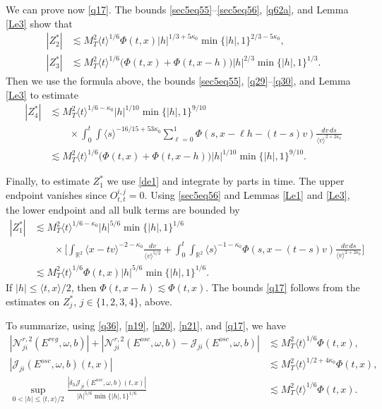 \documentclass[reqno,11pt]{amsart}
\numberwithin{equation}{section}
\def\R{{\mathbb R}}
\def\R{{\bf R}}
\def\R{\mathbb{R}}
\begin{document}
We can prove now \eqref{q17}. The bounds \eqref{sec5eq55}--\eqref{sec5eq56}, \eqref{q62a}, and Lemma \ref{Le3} show that
\begin{align*}
|Z_2^\ast|
&\lesssim M_T^2\langle t\rangle^{1/6}\Phi(t,x)
|h|^{1/3+5\kappa_0}\min\{|h|,1\}^{2/3-5\kappa_0},\\
|Z_3^\ast|
&\lesssim M_T^2\langle t\rangle^{1/6}
\big(\Phi(t,x)+\Phi(t,x-h)\big)
|h|^{2/3}\min\{|h|,1\}^{1/3}.
\end{align*}
Then we use the formula above, the bounds \eqref{sec5eq55}, \eqref{q29}--\eqref{q30}, and Lemma \ref{Le3} to estimate
\begin{align*}
|Z_4^\ast|&\lesssim M_T^2\langle t\rangle^{1/6-\kappa_0}
|h|^{1/10}\min\{|h|,1\}^{9/10}\\
&\qquad\times\int_0^t\!\!\int
\langle s\rangle^{-16/15+53\kappa_0}
\sum_{\ell=0}^1\Phi(s,x-\ell h-(t-s)v)
\frac{dv\,ds}{\langle v\rangle^{2+2\kappa_0}}\\
&\lesssim M_T^2\langle t\rangle^{1/6}
\big(\Phi(t,x)+\Phi(t,x-h)\big)
|h|^{1/10}\min\{|h|,1\}^{9/10}.
\end{align*}
 
Finally, to estimate $Z_1^\ast$ we use \eqref{de1} and integrate by parts in time. The upper
endpoint vanishes since $O_{t,t}^{i,j}=0$. Using \eqref{sec5eq56} and Lemmas \ref{Le1} and \ref{Le3}, the lower endpoint and all bulk
terms are bounded by
\begin{align*}
|Z_1^\ast|
&\lesssim M_T^2\langle t\rangle^{1/6-\kappa_0}
|h|^{5/6}\min\{|h|,1\}^{1/6}\\
&\qquad\times\Big[
\int_{\R^2}\langle x-tv\rangle^{-2-\kappa_0}\frac{dv}{\langle v\rangle^{5/2}}
+\int_0^t\!\!\int_{\R^2}\langle s\rangle^{-1-\kappa_0}
\Phi(s,x-(t-s)v)\frac{dv\,ds}{\langle v\rangle^{2+2\kappa_0}}\Big]\\
&\lesssim M_T^2\langle t\rangle^{1/6}\Phi(t,x)
|h|^{5/6}\min\{|h|,1\}^{1/6}.
\end{align*}
If $|h|\leq\langle t,x\rangle/2$, then
$\Phi(t,x-h)\lesssim\Phi(t,x)$. The bounds \eqref{q17} follows from the estimates on $Z_j^\ast$, $j\in\{1,2,3,4\}$, above.


To summarize, using \eqref{q36}, \eqref{n19}, \eqref{n20}, \eqref{n21}, and \eqref{q17}, we have
\begin{align}
|\mathcal N_{ji}^{r,2}(E^{reg},\omega,b)|
+|\mathcal N_{ji}^{r,2}(E^{osc},\omega,b)
-\mathcal J_{ji}(E^{osc},\omega,b)|
&\lesssim M_T^2\langle t\rangle^{1/6}\Phi(t,x),
\label{q40}\\
|\mathcal J_{ji}(E^{osc},\omega,b)(t,x)|
&\lesssim M_T^2\langle t\rangle^{1/2+4\kappa_0}\Phi(t,x),
\label{q41}\\
\sup_{0<|h|\leq\langle t,x\rangle/2}
\frac{|\delta_h\mathcal J_{ji}(E^{osc},\omega,b)(t,x)|}
{|h|^{5/6}\min\{|h|,1\}^{1/6}}
&\lesssim M_T^2\langle t\rangle^{1/6}\Phi(t,x).
\label{q42}
\end{align}
\end{document}
